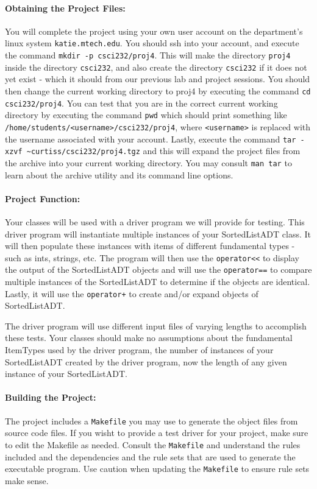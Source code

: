 \documentclass[10pt,letterpaper]{article}
\newcounter{x}\setcounter{x}{1}
\begin{document}
\paragraph{Obtaining the Project Files:} You will complete the project using your own user account on the department's linux system \verb|katie.mtech.edu|. You should ssh into your account, and execute the command \verb|mkdir -p csci232/proj4|. This will make the directory \verb|proj4| inside the directory \verb|csci232|, and also create the directory \verb|csci232| if it does not yet exist - which it should from our previous lab and project sessions. You should then change the current working directory to proj4 by executing the command \verb|cd csci232/proj4|. You can test that you are in the correct current working directory by executing the command \verb|pwd| which should print something like \verb|/home/students/<username>/csci232/proj4|, where \verb|<username>| is replaced with the username associated with your account. Lastly, execute the command \verb|tar -xzvf ~curtiss/csci232/proj4.tgz| and this will expand the project files from the archive into your current working directory. You may consult \verb|man tar| to learn about the archive utility and its command line options. 

\paragraph{Project Function:}  

Your classes will be used with a driver program we will provide for testing. This driver program will instantiate multiple instances of your SortedListADT class. It will then populate these instances with items of different fundamental types - such as ints, strings, etc. The program will then use the \verb|operator<<| to display the output of the SortedListADT objects and will use the \verb|operator==| to compare multiple instances of the SortedListADT to determine if the objects are identical. Lastly, it will use the \verb|operator+| to create and/or expand objects of SortedListADT.

The driver program will use different input files of varying lengths to accomplish these tests. Your classes should make no assumptions about the fundamental ItemTypes used by the driver program, the number of instances of your SortedListADT created by the driver program, now the length of any given instance of your SortedListADT.

\paragraph{Building the Project:} The project includes a \verb|Makefile| you may use to generate the object  files from source code files. If you wisht to provide a test driver for your project, make sure to edit the Makefile as needed. Consult the \verb|Makefile| and understand the rules included and the dependencies and the rule sets that are used to generate the executable program. Use caution when updating the \verb|Makefile| to ensure rule sets make sense. 
\end{document}
